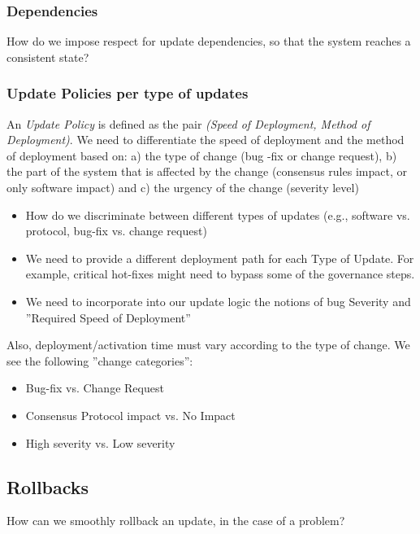 \subsubsection*{Dependencies}
How do we impose respect for update dependencies, so that the system reaches a consistent state? 

\subsubsection*{Update Policies per type of updates}
An \emph{Update Policy} is defined as the pair \emph{(Speed of Deployment, Method of Deployment)}. We need to differentiate the speed of deployment and the method of deployment based on: a) the type of change (bug -fix or change request), b) the part of the system that is affected by the change (consensus rules impact, or only software impact) and c) the urgency of the change (severity level)


\begin{itemize}
\item How do we discriminate between different types of updates (e.g., software vs. protocol, bug-fix vs. change request)
\item We need to provide a different deployment path for each Type of Update. For example, critical hot-fixes might need to bypass some of the governance steps.
\item We need to incorporate into our update logic the notions of bug Severity and ''Required Speed of Deployment''
\end{itemize}

Also, deployment/activation time must vary according to the type of change. We see the following ''change categories'':
\begin{itemize}
\item Bug-fix vs. Change Request
\item Consensus Protocol impact vs. No Impact
\item High severity vs. Low severity
\end{itemize}

\subsection*{Rollbacks}
How can we smoothly rollback an update, in the case of a problem?


